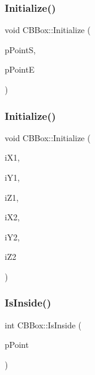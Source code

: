 \subsubsection{\texorpdfstring{Initialize()}{Initialize()}\hspace{0.1cm}{\footnotesize\ttfamily [1/2]}}
{\footnotesize\ttfamily void C\+B\+Box\+::\+Initialize (\begin{DoxyParamCaption}\item[{\mbox{\hyperlink{classCPoint}{C\+Point}} $\ast$}]{p\+PointS,  }\item[{\mbox{\hyperlink{classCPoint}{C\+Point}} $\ast$}]{p\+PointE }\end{DoxyParamCaption})}

\mbox{\label{classCBBox_a14455cfc9abfa1c70b1140d03e8afff2}} 
\subsubsection{\texorpdfstring{Initialize()}{Initialize()}\hspace{0.1cm}{\footnotesize\ttfamily [2/2]}}
{\footnotesize\ttfamily void C\+B\+Box\+::\+Initialize (\begin{DoxyParamCaption}\item[{int}]{i\+X1,  }\item[{int}]{i\+Y1,  }\item[{int}]{i\+Z1,  }\item[{int}]{i\+X2,  }\item[{int}]{i\+Y2,  }\item[{int}]{i\+Z2 }\end{DoxyParamCaption})}

\mbox{\label{classCBBox_a82263f5b6a58c13943b99140f664ddf0}} 
\subsubsection{\texorpdfstring{IsInside()}{IsInside()}\hspace{0.1cm}{\footnotesize\ttfamily [1/4]}}
{\footnotesize\ttfamily int C\+B\+Box\+::\+Is\+Inside (\begin{DoxyParamCaption}\item[{\mbox{\hyperlink{classCPoint}{C\+Point}} $\ast$}]{p\+Point }\end{DoxyParamCaption})}

